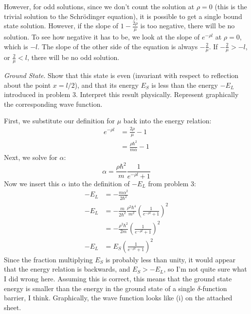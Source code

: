 \documentclass[a4paper,twoside]{article}
\begin{document}
\begin{itemize}
\begin{problem}
        However, for odd solutions, since we don't count the solution at $ \rho = 0 $ (this is the trivial solution to the Schr\"odinger equation), it is possible to get a single bound state solution. However, if the slope of $ 1 - \frac{2 \rho}{\mu} $ is too negative, there will be no solution. To see how negative it has to be, we look at the slope of $ e^{- \rho l} $ at $ \rho = 0 $, which is $ - l $. The slope of the other side of the equation is always $ -\frac{2}{\mu} $. If $ - \frac{2}{\mu} > - l $, or $ \frac{2}{\mu} < l $, there will be no odd solution.
    \end{problem}
    \subitem[(i)] \textit{Ground State}. Show that this state is even (invariant with respect to reflection about the point $ x = l/2 $), and that its energy $ E_S $ is less than the energy $ -E_L $ introduced in problem 3. Interpret this result physically. Represent graphically the corresponding wave function.
    \begin{problem}
        First, we substitute our definition for $ \mu $ back into the energy relation:
        \begin{align}
            e^{- \rho l} &= \frac{2 \rho}{\mu} - 1\\
            &= \frac{\rho \hbar^2}{m \alpha} - 1
        \end{align}
        Next, we solve for $ \alpha $:
        \begin{equation}
            \alpha = \frac{\rho\hbar^2}{m} \frac{1}{e^{- \rho l} + 1}
        \end{equation}
        Now we insert this $\alpha$ into the definition of $ - E_L $ from problem 3:
        \begin{align}
            - E_L &= - \frac{m \alpha^2}{2 \hbar^2}\\
            - E_L &= - \frac{m}{2 \hbar^2} \frac{\rho^2 \hbar^4}{m^2}\left( \frac{1}{e^{- \rho l} + 1} \right)^2\\
            &= - \frac{\rho^2 \hbar^2}{2 m} \left( \frac{1}{e^{- \rho l} +1} \right)^2\\
            - E_L &= E_S \left( \frac{1}{e^{- \rho l} +1} \right)^2
        \end{align}
        Since the fraction multiplying $ E_S $ is probably less than unity, it would appear that the energy relation is backwards, and $ E_S > -E_L $, so I'm not quite sure what I did wrong here. Assuming this is correct, this means that the ground state energy is smaller than the energy in the ground state of a single $\delta$-function barrier, I think. Graphically, the wave function looks like (i) on the attached sheet.


\end{problem}
\end{itemize}
\end{document}
